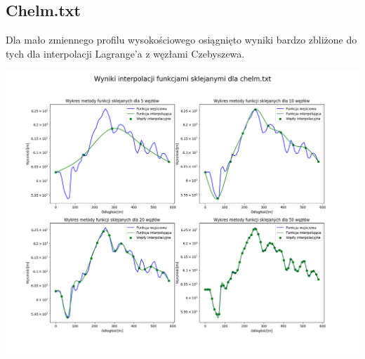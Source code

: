 \documentclass[a4paper,12pt]{article}
\begin{document}
	\subsection{Chelm.txt}
	Dla mało zmiennego profilu wysokościowego osiągnięto wyniki bardzo zbliżone do tych dla interpolacji Lagrange'a z węzłami Czebyszewa. 
	\begin{center}
        \includegraphics[scale=0.4]{../charts/cubic_spline_chelm.png}
    \end{center}
    
    \newpage
\end{document}
